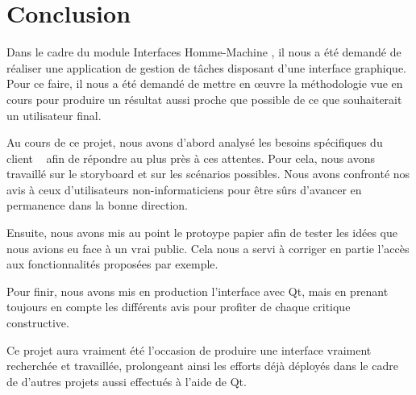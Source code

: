 \chapter*{Conclusion}
	Dans le cadre du module \og Interfaces Homme-Machine \fg , il nous a été demandé de réaliser une application de gestion de tâches disposant d'une interface graphique. Pour ce faire, il nous a été demandé de mettre en {\oe}uvre la méthodologie vue en cours pour produire un résultat aussi proche que possible de ce que souhaiterait un utilisateur final.
	
	Au cours de ce projet, nous avons d'abord analysé les besoins spécifiques du \og client \fg~ afin de répondre au plus près à ces attentes. Pour cela, nous avons travaillé sur le storyboard et sur les scénarios possibles. Nous avons confronté nos avis à ceux d'utilisateurs non-informaticiens pour être sûrs d'avancer en permanence dans la bonne direction.
	
	Ensuite, nous avons mis au point le protoype papier afin de tester les idées que nous avions eu face à un vrai public. Cela nous a servi à corriger en partie l'accès aux fonctionnalités proposées par exemple.
	
	Pour finir, nous avons mis en production l'interface avec Qt, mais en prenant toujours en compte les différents avis pour profiter de chaque critique constructive.
	
	Ce projet aura vraiment été l'occasion de produire une interface vraiment recherchée et travaillée, prolongeant ainsi les efforts déjà déployés dans le cadre de d'autres projets aussi effectués à l'aide de Qt.
